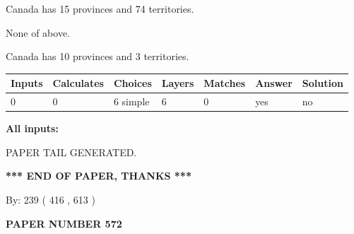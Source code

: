 \documentclass[12pt]{article}
\begin{document}
 
Canada has  15 provinces and  74 territories.
 
 
 None of above.
 
 
\noindent{}
 
 
Canada has 10  provinces and 3 territories.
 
 
\noindent{}
 
 
   
   
   
   
\noindent\begin{tabular}{|l|l|l|l|l|l|l|}
 \hline
Inputs & Calculates & Choices & Layers & Matches & Answer & Solution \\ \hline
 0  & 
 0  & 
 6
  simple  
  & 
 6  & 
 0  & 
  yes & 
  no 
  \\ \hline
 \end{tabular}
   
   
   
   
\noindent{}
   
   
   
   
\noindent\vspace{0.1in}\hspace{-0.08in} {\textbf{\Large{All inputs: }}}
   
   
   
   
   
   
 \vspace{0.2in}
 
   
   
\vspace{2.0in} PAPER TAIL GENERATED.
   
   
   
   
\vspace{1.0in} 
{\textbf{\large{ *** END OF PAPER, THANKS *** }}} 
   
   
\hspace{1.0in} By: 
 239 ( 416 ,  613 )
   
   
   
   
\newpage 
\setcounter{page}{ 
   572001 } 
   
   
   
   
 {\textbf{ \Large{ PAPER NUMBER  572  }}}
   
\end{document}
